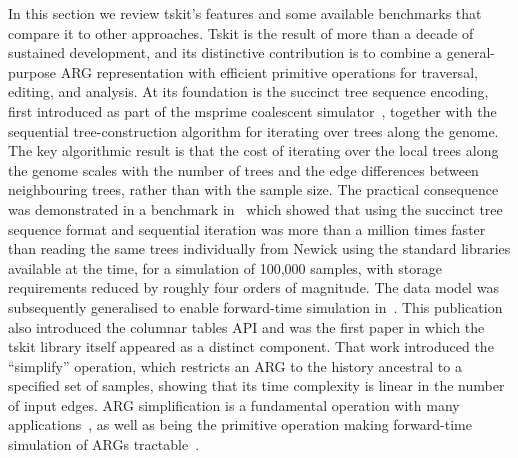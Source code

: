 \documentclass{article}
\begin{document}
In this section we review tskit's features and some available benchmarks
that compare it to other approaches.
Tskit is the result of more than a decade of sustained development,
and its distinctive contribution is to combine a general-purpose ARG
representation with efficient primitive operations for traversal,
editing, and analysis.
At its foundation is the succinct tree sequence encoding,
first introduced as part of the msprime coalescent
simulator~\citep{kelleher2016efficient}, together with the
sequential tree-construction algorithm for iterating over
trees along the genome.
The key algorithmic result is that
the cost of iterating over the local trees along the genome scales
with the number of trees and the edge differences between neighbouring
trees, rather than with the sample size.
The practical consequence was demonstrated in a benchmark in~\citet{kelleher2016efficient}
which showed that using the succinct tree sequence format and sequential iteration was more
than a million times faster than reading the same trees individually
from Newick using the standard libraries available at the time, for a
simulation of 100,000 samples, with storage requirements reduced by
roughly four orders of magnitude.
The data model was subsequently generalised to enable forward-time
simulation in~\citet{kelleher2018efficient}. This publication also
introduced the columnar tables API and was the first paper in which
the tskit library itself appeared as a distinct component.
That work introduced the ``simplify'' operation, which restricts an ARG
to the history ancestral to a specified set of samples, showing that
its time complexity is linear in the number of input edges.
ARG simplification is a fundamental operation with many
applications~\citep{wong2024general}, as well as being the primitive
operation making forward-time simulation of ARGs
tractable~\citep{haller2018tree}.
\end{document}
